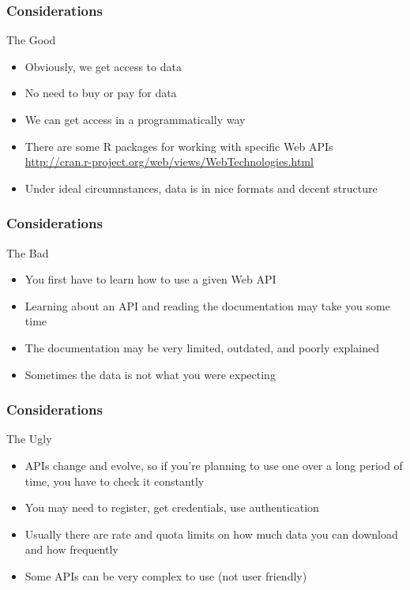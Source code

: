 \documentclass{beamer}\usepackage[]{graphicx}\usepackage[]{color}
\begin{document}

\begin{frame}
\frametitle{Considerations}

\begin{block}{The Good}
\begin{itemize}
 \item Obviously, we get access to data 
 \item No need to buy or pay for data 
 \item We can get access in a programmatically way
 \item There are some R packages for working with specific Web APIs \\
{\scriptsize \url{http://cran.r-project.org/web/views/WebTechnologies.html}}
 \item Under ideal circumnstances, data is in nice formats and decent structure
\end{itemize}
\end{block}

\end{frame}


\begin{frame}
\frametitle{Considerations}

\begin{block}{The Bad}
\begin{itemize}
 \item You first have to learn how to use a given Web API
 \item Learning about an API and reading the documentation may take you some time
 \item The documentation may be very limited, outdated, and poorly explained
 \item Sometimes the data is not what you were expecting
\end{itemize}
\end{block}

\end{frame}


\begin{frame}
\frametitle{Considerations}

\begin{block}{The Ugly}
\begin{itemize}
 \item APIs change and evolve, so if you're planning to use one over a long period of time, you have to check it constantly
 \item You may need to register, get credentials, use authentication
 \item Usually there are rate and quota limits on how much data you can download and how frequently
 \item Some APIs can be very complex to use (not user friendly)
\end{itemize}
\end{block}

\end{frame}
\end{document}
